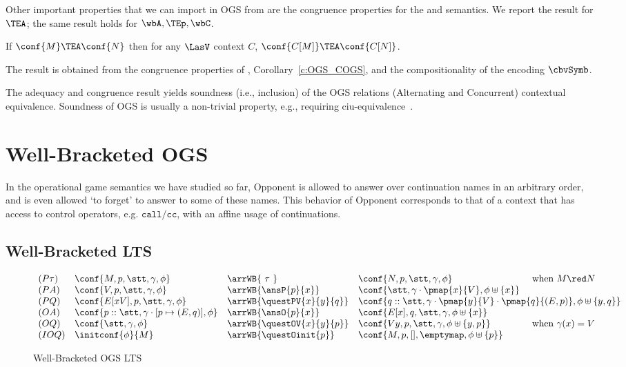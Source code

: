 \noindent
Other important properties that we can import in OGS from \piI
are the congruence properties for the \AOGS and \COGS semantics. 
We report the result for  $\TEA$; the same result holds for 
$\wbA,\TEp, \wbC$.
\begin{theorem}
 If $\conf{M} \TEA \conf{N}$
 then for any $\LasV$  context $C$, $\conf{C[M]} \TEA \conf{C[N]}$.
\end{theorem}

\noindent
The result is obtained  from the congruence properties of \piI, 
Corollary~\ref{c:OGS_COGS}, and the compositionality
of the encoding $\cbvSymb$.

\iflong
The adequacy and congruence result yields soundness (i.e., inclusion) 
of the OGS relations (Alternating and
Concurrent) \wrt contextual equivalence. Soundness of OGS
is usually a non-trivial property, e.g., requiring 
ciu-equivalence~\cite{laird2007}.


\fi %
\section{Well-Bracketed OGS}
\label{s:wb-ogs}

In the operational game semantics we have studied so far, Opponent is allowed to 
answer over continuation names in an arbitrary order, and is 
even allowed `to forget' to answer 
to some of these names.
This behavior of Opponent 
corresponds to that of a context that has 
access to control operators, e.g. $\mathtt{call/cc}$, with an affine usage of continuations.


\subsection{Well-Bracketed LTS}


\begin{figure}
\[\begin{array}{lllll}
 (P\tau) & \conf{M,p,\stt,\gamma,\phi} & \arrWB{\ \tau \ } & 
  \conf{N,p,\stt,\gamma,\phi} & \text{ when } M \red N\\
%
 (PA) & \conf{V,p,\stt,\gamma,\phi} & \arrWB{\ansP{p}{x}} & 
  \conf{\stt,\gamma \cdot \pmap{x}{V},\phi \uplus \{x\}} \\
%
 (PQ) & \conf{E[xV],p,\stt,\gamma,\phi} & \arrWB{\questPV{x}{y}{q}} & 
  \multicolumn{2}{c}
    {\conf{q::\stt,\gamma \cdot \pmap{y}{V}\cdot \pmap{q}{(E,p)},\phi \uplus \{y,q\}}} \\
%
 (OA) & \conf{p::\stt,\gamma\cdot [p \mapsto (E,q)],\phi} & \arrWB{\ansO{p}{x}} & 
  \conf{E[x],q,\stt,\gamma,\phi \uplus \{x\}} \\
%
 (OQ) & \conf{\stt,\gamma,\phi} & \arrWB{\questOV{x}{y}{p}} & 
  \conf{V y,p,\stt,\gamma,\phi \uplus \{y,p\}} & 
  \text{ when } \gamma(x) = V\\
%
 (IOQ) & \initconf{\phi}{M} & \arrWB{\questOinit{p}} &
     \conf{M,p,[],\emptymap,\phi \uplus \{p\}}
\end{array}\]
\caption{Well-Bracketed OGS LTS}
\label{fig:stacked-lts}
\end{figure}

